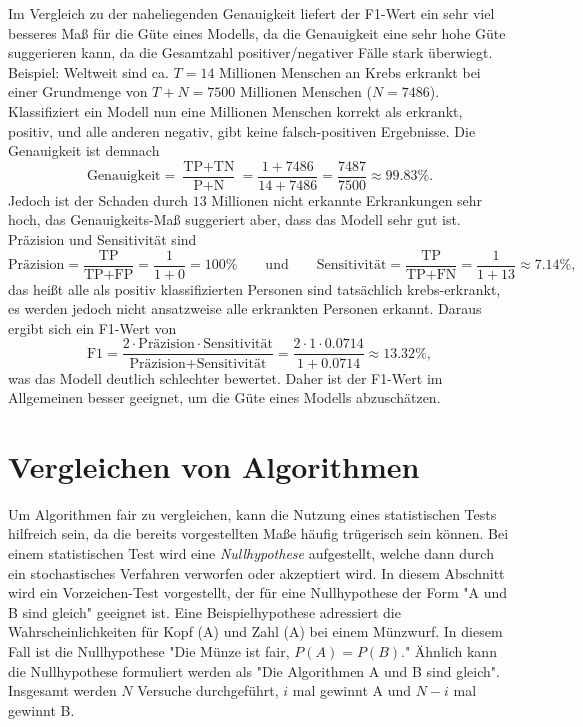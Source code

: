 				Im Vergleich zu der naheliegenden Genauigkeit liefert der F1-Wert ein sehr viel besseres Maß für die Güte eines Modells, da die Genauigkeit eine sehr hohe Güte suggerieren kann, da die Gesamtzahl positiver/negativer Fälle stark überwiegt. Beispiel: Weltweit sind ca. \(T = 14\) Millionen Menschen an Krebs erkrankt bei einer Grundmenge von \(T + N = 7500\) Millionen Menschen (\dh \(N = 7486\)). Klassifiziert ein Modell nun eine Millionen Menschen korrekt als erkrankt, \dh positiv, und alle anderen negativ, gibt keine falsch-positiven Ergebnisse. Die Genauigkeit ist demnach
				\begin{equation}
					\text{Genauigkeit}
						= \frac{\text{TP} + \text{TN}}{\text{P} + \text{N}}
						= \frac{1 + 7486}{14 + 7486}
						= \frac{7487}{7500}
						\approx 99.83\%.
				\end{equation}
				Jedoch ist der Schaden durch \(13\) Millionen nicht erkannte Erkrankungen sehr hoch, das Genauigkeits-Maß suggeriert aber, dass das Modell sehr gut ist. Präzision und Sensitivität sind
				\begin{equation}
					\text{Präzision}
						= \frac{\text{TP}}{\text{TP} + \text{FP}}
						= \frac{1}{1 + 0} = 100\%
					\qquad\text{und}\qquad
					\text{Sensitivität}
						= \frac{\text{TP}}{\text{TP} + \text{FN}}
						= \frac{1}{1 + 13} \approx 7.14\%,
				\end{equation}
				das heißt alle als positiv klassifizierten Personen sind tatsächlich krebs-erkrankt, es werden jedoch nicht ansatzweise alle erkrankten Personen erkannt. Daraus ergibt sich ein F1-Wert von
				\begin{equation}
					\text{F1}
						= \frac{2 \cdot \text{Präzision} \cdot \text{Sensitivität}}{\text{Präzision} + \text{Sensitivität}}
						= \frac{2 \cdot 1 \cdot 0.0714}{1 + 0.0714}
						\approx 13.32\%,
				\end{equation}
				was das Modell deutlich schlechter bewertet. Daher ist der F1-Wert im Allgemeinen besser geeignet, um die Güte eines Modells abzuschätzen.

	\section{Vergleichen von Algorithmen}  %
		Um Algorithmen fair zu vergleichen, kann die Nutzung eines statistischen Tests hilfreich sein, da die bereits vorgestellten Maße häufig trügerisch sein können. Bei einem statistischen Test wird eine \emph{Nullhypothese} aufgestellt, welche dann durch ein stochastisches Verfahren verworfen oder akzeptiert wird. In diesem Abschnitt wird ein Vorzeichen-Test vorgestellt, der für eine Nullhypothese der Form "A und B sind gleich" geeignet ist. Eine Beispielhypothese adressiert die Wahrscheinlichkeiten für Kopf (A) und Zahl (A) bei einem Münzwurf. In diesem Fall ist die Nullhypothese "Die Münze ist fair, \dh \( P(A) = P(B) \)." Ähnlich kann die Nullhypothese formuliert werden als "Die Algorithmen A und B sind gleich". Insgesamt werden \(N\) Versuche durchgeführt, \(i\) mal gewinnt A und \(N - i\) mal gewinnt B.

